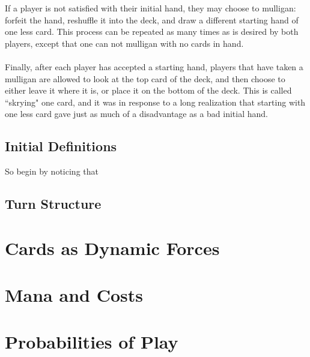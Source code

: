 \documentclass{article}
\begin{document}
If a player is not satisfied with their initial hand, they may choose to mulligan: forfeit the hand, reshuffle it into the deck, and draw a different starting hand of one less card. This process can be repeated as many times as is desired by both players, except that one can not mulligan with no cards in hand.

\paragraph{}
Finally, after each player has accepted a starting hand, players that have taken a mulligan are allowed to look at the top card of the deck, and then choose to either leave it where it is, or place it on the bottom of the deck. This is called ``skrying" one card, and it was in response to a long realization that starting with one less card gave just as much of a disadvantage as a bad initial hand.

\subsection{Initial Definitions}
So begin by noticing that 

\subsection{Turn Structure}

\section{Cards as Dynamic Forces}

\section{Mana and Costs}

\section{Probabilities of Play}
\end{document}

